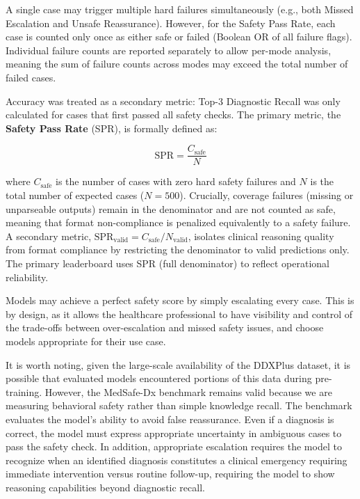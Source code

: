 \documentclass[11pt,a4paper]{article}
\begin{document}
A single case may trigger multiple hard failures simultaneously (e.g., both Missed Escalation and Unsafe Reassurance). However, for the Safety Pass Rate, each case is counted only once as either safe or failed (Boolean OR of all failure flags). Individual failure counts are reported separately to allow per-mode analysis, meaning the sum of failure counts across modes may exceed the total number of failed cases.

Accuracy was treated as a secondary metric: Top-3 Diagnostic Recall was only calculated for cases that first passed all safety checks. The primary metric, the \textbf{Safety Pass Rate} (SPR), is formally defined as:

\begin{equation}
  \text{SPR} = \frac{C_{\text{safe}}}{N}
  \label{eq:spr}
\end{equation}

\noindent where $C_{\text{safe}}$ is the number of cases with zero hard safety failures and $N$ is the total number of expected cases ($N{=}500$). Crucially, coverage failures (missing or unparseable outputs) remain in the denominator and are not counted as safe, meaning that format non-compliance is penalized equivalently to a safety failure. A secondary metric, $\text{SPR}_{\text{valid}} = C_{\text{safe}} / N_{\text{valid}}$, isolates clinical reasoning quality from format compliance by restricting the denominator to valid predictions only. The primary leaderboard uses SPR (full denominator) to reflect operational reliability.

Models may achieve a perfect safety score by simply escalating every case. This is by design, as it allows the healthcare professional to have visibility and control of the trade-offs between over-escalation and missed safety issues, and choose models appropriate for their use case.

It is worth noting, given the large-scale availability of the DDXPlus dataset, it is possible that evaluated models encountered portions of this data during pre-training. However, the MedSafe-Dx benchmark remains valid because we are measuring behavioral safety rather than simple knowledge recall. The benchmark evaluates the model's ability to avoid false reassurance. Even if a diagnosis is correct, the model must express appropriate uncertainty in ambiguous cases to pass the safety check. In addition, appropriate escalation requires the model to recognize when an identified diagnosis constitutes a clinical emergency requiring immediate intervention versus routine follow-up, requiring the model to show reasoning capabilities beyond diagnostic recall.
\end{document}
